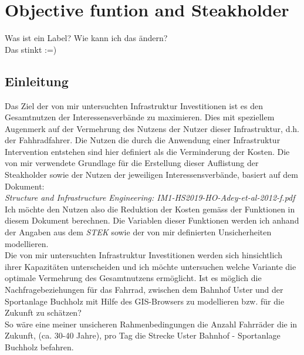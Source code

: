 %
%
%
%

\chapter{Objective funtion and Steakholder}
\label{chap:background}
Was ist ein Label? \newline
Wie kann ich das ändern? \\ [2ex]
Das stinkt :=)
\section{\textbf{{Einleitung}}}

Das Ziel der von mir untersuchten Infrastruktur Investitionen ist es den Gesamtnutzen der Interessensverbände zu maximieren. \newline Dies mit speziellem Augenmerk auf der Vermehrung des Nutzens der Nutzer dieser Infrastruktur, d.h. der Fahhradfahrer. \newline
Die Nutzen die durch die Anwendung einer Infrastruktur Intervention entstehen sind hier definiert als die Verminderung der Kosten. \newline
Die von mir verwendete Grundlage für die Erstellung dieser Auflistung der Steakholder sowie der Nutzen der jeweiligen Interessensverbände, basiert auf dem Dokument: \\ [2ex]
\noindent\hspace*{10mm}\textit{Structure and Infrastructure Engineering: IM1-HS2019-HO-Adey-et-al-2012-f.pdf} \\ [2ex]
Ich möchte den Nutzen also die Reduktion der Kosten gemäss der Funktionen in diesem Dokument berechnen. 
Die Variablen dieser Funktionen werden ich anhand der Angaben aus dem \textit{STEK} sowie der von mir definierten Unsicherheiten modellieren. \\ [2ex]
Die von mir untersuchten Infrastruktur Investitionen werden sich hinsichtlich ihrer Kapazitäten unterscheiden und ich möchte untersuchen welche Variante die optimale Vermehrung des Gesamtnutzens ermöglicht. \newline
Ist es möglich die Nachfragebeziehungen für das Fahrrad, zwischen dem Bahnhof Uster und der Sportanlage Buchholz mit Hilfe des GIS-Browsers zu modellieren bzw. für die Zukunft zu schätzen? \\ [2ex]
So wäre eine meiner unsicheren Rahmenbedingungen die Anzahl Fahrräder die in Zukunft, \newline (ca. 30-40 Jahre), pro Tag die Strecke Uster Bahnhof - Sportanlage Buchholz befahren.

